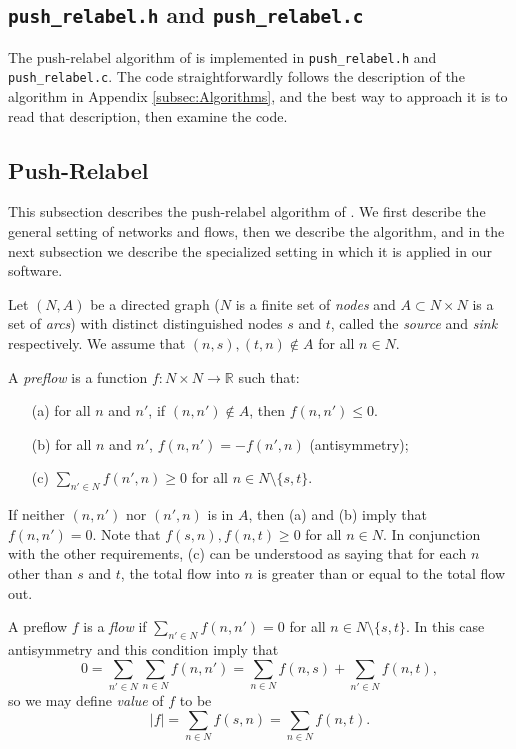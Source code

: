 \documentclass[12pt]{article}
\theoremstyle{definition}
\renewcommand{\Re}{\mathbb{R}}
\begin{document}
\begin{appendix}
\subsection{\texttt{push\_relabel.h} and \texttt{push\_relabel.c}}
\label{subsec:PushRelabel}

The push-relabel algorithm of \cite{GoTa88} is implemented in
\texttt{push\_relabel.h} and \texttt{push\_relabel.c}.  The code
straightforwardly follows the description of the algorithm in Appendix
\ref{subsec:Algorithms}, and the best way to approach it is to read that
description, then examine the code.

\subsection{Push-Relabel}

This subsection describes the push-relabel algorithm of \cite{GoTa88}.
We first describe the general setting of networks and flows, then we
describe the algorithm, and in the next subsection we describe the
specialized setting in which it is applied in our software.

Let $(N,A)$ be a directed graph ($N$ is a finite set of \emph{nodes}
and $A \subset N \times N$ is a set of \emph{arcs}) with distinct
distinguished nodes $s$ and $t$, called the \emph{source} and
\emph{sink} respectively.  We assume that $(n,s), (t, n) \notin A$ for
all $n \in N$.

A \emph{preflow} is a function $f \colon N \times N \to \Re$ such that:
\begin{enumerate}
  \item[(a)] for all $n$ and $n'$,  if $(n,n') \notin A$, then $f(n,n') \le 0$.
  \item[(b)] for all $n$ and $n'$,  $f(n,n') = - f(n',n)$ (antisymmetry); 
  \item[(c)] $\sum_{n' \in N} f(n',n) \ge 0$ for all $n \in N \setminus \{s,t\}$. 
\end{enumerate}
If neither $(n,n')$ nor $(n',n)$ is in $A$, then (a) and (b) imply
that $f(n,n') = 0$.  Note that $f(s,n), f(n,t) \ge 0$ for all $n \in
N$.  In conjunction with the other requirements, (c) can be understood
as saying that for each $n$ other than $s$ and $t$, the total flow
into $n$ is greater than or equal to the total flow out.

A preflow $f$ is a \emph{flow} if $\sum_{n' \in N} f(n,n') = 0$ for
all $n \in N \setminus \{s,t\}$.  In this case antisymmetry and this
condition imply that
$$0 = \sum_{n' \in N}\sum_{n \in N} f(n,n') = \sum_{n \in N} f(n,s) + \sum_{n' \in N} f(n,t),$$
so we may define \emph{value} of $f$ to be
$$|f| = \sum_{n \in N} f(s,n) = \sum_{n \in N} f(n,t).$$


\end{appendix}
\end{document}
